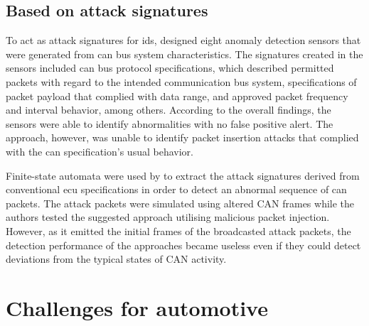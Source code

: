 \subsection{Based on attack signatures}

To act as attack signatures for \gls{ids}, \cite{muter2010} designed eight anomaly detection sensors that were generated from \gls{can} bus system characteristics. The signatures created in the sensors included \gls{can} bus protocol specifications, which described permitted packets with regard to the intended communication bus system, specifications of packet payload that complied with data range, and approved packet frequency and interval behavior, among others. According to the overall findings, the sensors were able to identify abnormalities with no false positive alert. The approach, however, was unable to identify packet insertion attacks that complied with the \gls{can} specification's usual behavior.\par
Finite-state automata were used by \cite{studnia2018} to extract the attack signatures derived from conventional \gls{ecu} specifications in order to detect an abnormal sequence of \gls{can} packets. The attack packets were simulated using altered CAN frames while the authors tested the suggested approach utilising malicious packet injection. However, as it emitted the initial frames of the broadcasted attack packets, the detection performance of the approaches became useless even if they could detect deviations from the typical states of CAN activity.

\section{Challenges for automotive}

